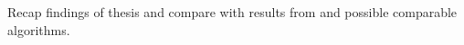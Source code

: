 Recap findings of thesis and compare with results from \cite[]{Birklbauer2021} and possible comparable algorithms.